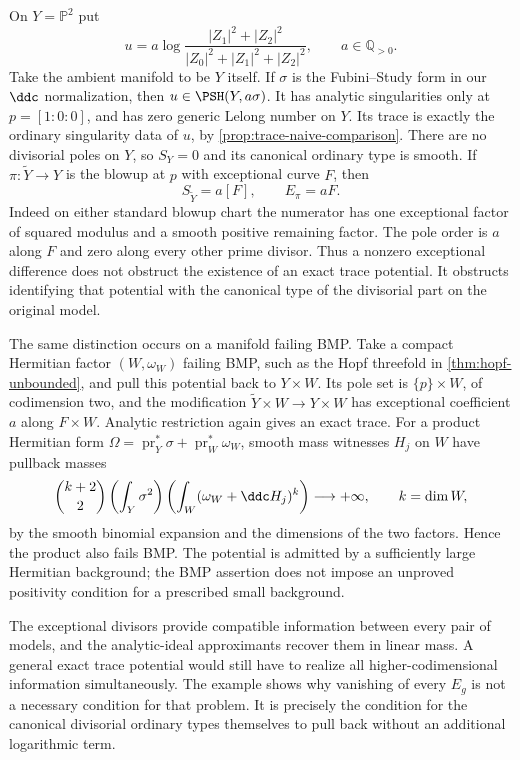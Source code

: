 \begin{example}\label{ex:exceptional-trace-with-exact-potential}
On $Y=\mathbb P^2$ put
\[
 u=a\log\frac{|Z_1|^2+|Z_2|^2}
                   {|Z_0|^2+|Z_1|^2+|Z_2|^2},\qquad a\in\mathbb Q_{>0}.
\]
Take the ambient manifold to be $Y$ itself. If $\sigma$ is the Fubini--Study form in our $\ddc$ normalization, then $u\in\PSH(Y,a\sigma)$. It has analytic singularities only at $p=[1:0:0]$, and has zero generic Lelong number on $Y$. Its trace is exactly the ordinary singularity data of $u$, by \cref{prop:trace-naive-comparison}. There are no divisorial poles on $Y$, so $S_Y=0$ and its canonical ordinary type is smooth. If $\pi:\widetilde Y\to Y$ is the blowup at $p$ with exceptional curve $F$, then
\[
 S_{\widetilde Y}=a[F],\qquad E_\pi=aF.
\]
Indeed on either standard blowup chart the numerator has one exceptional factor of squared modulus and a smooth positive remaining factor. The pole order is $a$ along $F$ and zero along every other prime divisor. Thus a nonzero exceptional difference does not obstruct the existence of an exact trace potential. It obstructs identifying that potential with the canonical type of the divisorial part on the original model.

The same distinction occurs on a manifold failing BMP. Take a compact Hermitian factor $(W,\omega_W)$ failing BMP, such as the Hopf threefold in \cref{thm:hopf-unbounded}, and pull this potential back to $Y\times W$. Its pole set is $\{p\}\times W$, of codimension two, and the modification $\widetilde Y\times W\to Y\times W$ has exceptional coefficient $a$ along $F\times W$. Analytic restriction again gives an exact trace. For a product Hermitian form $\Omega=\operatorname{pr}_Y^*\sigma+\operatorname{pr}_W^*\omega_W$, smooth mass witnesses $H_j$ on $W$ have pullback masses
\[
 \binom{k+2}{2}\left(\int_Y\sigma^2\right)
          \left(\int_W(\omega_W+\ddc H_j)^k\right)\longrightarrow+\infty,
 \qquad k=\dim W,
\]
by the smooth binomial expansion and the dimensions of the two factors. Hence the product also fails BMP. The potential is admitted by a sufficiently large Hermitian background; the BMP assertion does not impose an unproved positivity condition for a prescribed small background.
\end{example}

The exceptional divisors provide compatible information between every pair of models, and the analytic-ideal approximants recover them in linear mass. A general exact trace potential would still have to realize all higher-codimensional information simultaneously. The example shows why vanishing of every $E_g$ is not a necessary condition for that problem. It is precisely the condition for the canonical divisorial ordinary types themselves to pull back without an additional logarithmic term.
